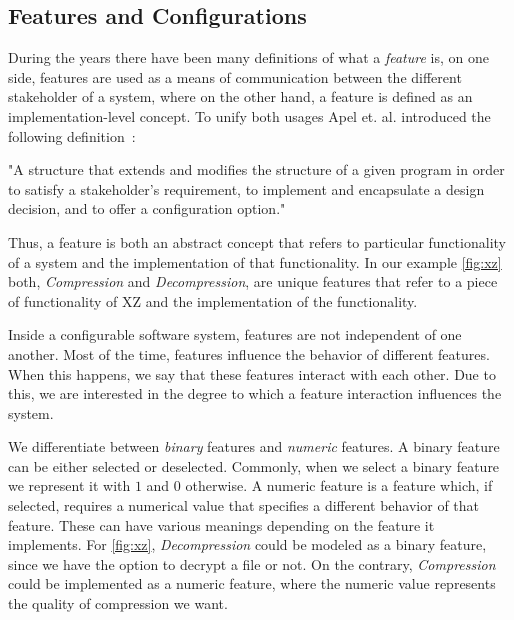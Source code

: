\subsection{Features and Configurations}\label{feature-config}

During the years there have been many definitions of what a \emph{feature} is, on one side, features are used as a means of communication between
the different stakeholder of a system, where on the other hand, a feature is defined as an implementation-level concept. 
To unify both usages Apel et. al. introduced the following definition~\cite{Feature-Oriented-Software-Product-Lines}:

\begin{definition}
    "A structure that extends and modifies the structure of a
    given program in order to satisfy a stakeholder's requirement, to implement and
    encapsulate a design decision, and to offer a configuration option."     
\end{definition}

Thus, a feature is both an abstract concept that refers to particular functionality of a system and the implementation of that functionality.
In our example \autoref{fig:xz} both, \textit{Compression} and \textit{Decompression}, are unique features 
that refer to a piece of functionality of \textsc{XZ} and the implementation of the functionality. 

Inside a configurable software system, features are not independent of one another. 
Most of the time, features influence the behavior of different features. 
When this happens, we say that these features interact with each other. 
Due to this, we are interested in the degree to which a feature interaction influences the system.

We differentiate between \emph{binary} features and \emph{numeric} features. A binary feature can be either selected or deselected.
Commonly, when we select a binary feature we represent it with $1$ and $0$ otherwise. 
A numeric feature is a feature which, if selected, requires a numerical value that specifies a different behavior of that feature.
These can have various meanings depending on the feature it implements. 
For \autoref{fig:xz}, \textit{Decompression} could be modeled as a binary feature, since we have the option to decrypt a file or not. On the contrary, 
\textit{Compression} could be implemented as a numeric feature, where the numeric value represents the quality of compression we want. 


